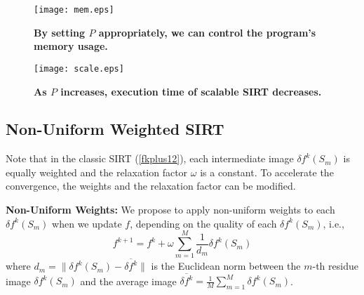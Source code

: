 \documentclass{sig-alternate}
\begin{document}


\begin{figure}[th]
\centering
{\texttt{[image: mem.eps]}} 
\caption{\bf By setting $P$ appropriately, we can control the program's memory usage. }
\label{mem}
\end{figure}

\begin{figure}[th]
\centering
{\texttt{[image: scale.eps]}} 
\caption{\bf As $P$ increases, execution time of scalable SIRT decreases.}
\label{scale}
\end{figure}

\subsection{Non-Uniform Weighted SIRT}
Note that in the classic SIRT (\ref{fkplus12}), each intermediate image $\delta f^k(S_m)$ is equally weighted and the relaxation factor $\omega$ is a constant. To accelerate the convergence, the weights and the relaxation factor can be modified.

{\bf Non-Uniform Weights:} We propose to apply non-uniform weights to each $\delta f^k(S_m)$ when we update $f$, depending on the quality of each $\delta f^k(S_m)$, i.e., 
\begin{equation}
f^{k+1} = f^k + \omega \sum_{m=1}^M \frac{1}{d_m} \delta f^k(S_m)
\end{equation}
where $d_m = \|\delta f^k(S_m) - \overline{\delta f^k}\|$ is the Euclidean norm between the $m$-th residue image $\delta f^k(S_m)$ and the average image $\overline{\delta f^k} = \frac{1}{M} \sum_{m=1}^M \delta f^k(S_m)$.


\end{document}
